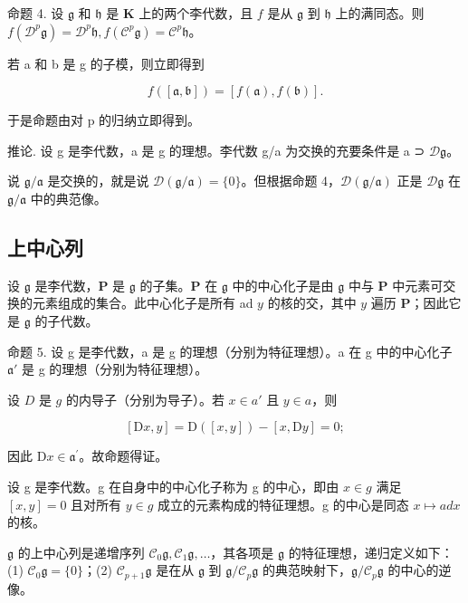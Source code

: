命题 4. 设 \(\mathfrak{g}\) 和 \(\mathfrak{h}\) 是 \(\mathbf{K}\) 上的两个李代数，且 \(f\) 是从 \(\mathfrak{g}\) 到 \(\mathfrak{h}\) 上的满同态。则 \(f(\mathcal{D}^p\mathfrak{g}) = \mathcal{D}^{p}\mathfrak{h}, f(\mathcal{C}^p\mathfrak{g}) = \mathcal{C}^{p}\mathfrak{h}\)。

若 a 和 b 是 g 的子模，则立即得到

\[
f ([ \mathfrak {a}, \mathfrak {b} ]) = [ f (\mathfrak {a}), f (\mathfrak {b}) ].
\]

于是命题由对 p 的归纳立即得到。

推论. 设 g 是李代数，a 是 g 的理想。李代数 g/a 为交换的充要条件是 a ⊃ \(\mathcal{D}\mathfrak{g}\)。

说 \(\mathfrak{g} / \mathfrak{a}\) 是交换的，就是说 \(\mathcal{D}(\mathfrak{g} / \mathfrak{a}) = \{0\}\)。但根据命题 4，\(\mathcal{D}(\mathfrak{g} / \mathfrak{a})\) 正是 \(\mathcal{D}\mathfrak{g}\) 在 \(\mathfrak{g} / \mathfrak{a}\) 中的典范像。

\subsection{上中心列}

设 \(\mathfrak{g}\) 是李代数，\(\mathbf{P}\) 是 \(\mathfrak{g}\) 的子集。\(\mathbf{P}\) 在 \(\mathfrak{g}\) 中的中心化子是由 \(\mathfrak{g}\) 中与 \(\mathbf{P}\) 中元素可交换的元素组成的集合。此中心化子是所有 ad \(y\) 的核的交，其中 \(y\) 遍历 \(\mathbf{P}\)；因此它是 \(\mathfrak{g}\) 的子代数。

命题 5. 设 g 是李代数，a 是 g 的理想（分别为特征理想）。a 在 g 中的中心化子 \(\mathfrak{a}'\) 是 g 的理想（分别为特征理想）。

设 \(D\) 是 \(g\) 的内导子（分别为导子）。若 \(x \in a'\) 且 \(y \in a\)，则

\[
[ \mathrm{D} x, y ] = \mathrm{D} ([ x, y ]) - [ x, \mathrm{D} y ] = 0;
\]

因此 \(\mathrm{D}x\in \mathfrak{a}^{\prime}\)。故命题得证。

设 g 是李代数。g 在自身中的中心化子称为 g 的中心，即由 \(x \in g\) 满足 \([x, y] = 0\) 且对所有 \(y \in g\) 成立的元素构成的特征理想。g 的中心是同态 \(x \mapsto ad x\) 的核。

\(\mathfrak{g}\) 的上中心列是递增序列 \(\mathcal{C}_{0}\mathfrak{g},\mathcal{C}_{1}\mathfrak{g},\ldots\)，其各项是 \(\mathfrak{g}\) 的特征理想，递归定义如下：(1) \(\mathcal{C}_{0}\mathfrak{g} = \{0\}\)；(2) \(\mathcal{C}_{p + 1}\mathfrak{g}\) 是在从 \(\mathfrak{g}\) 到 \(\mathfrak{g} / \mathcal{C}_{p}\mathfrak{g}\) 的典范映射下，\(\mathfrak{g} / \mathcal{C}_{p}\mathfrak{g}\) 的中心的逆像。

